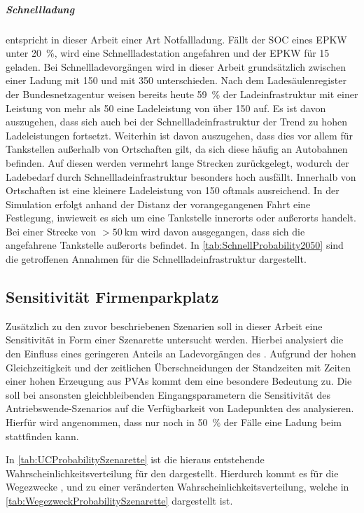 \subparagraph{Schnellladung} entspricht in dieser Arbeit einer Art Notfallladung.
Fällt der \gls{SOC} eines \gls{EPKW} unter \SI{20}{\percent}, wird eine Schnellladestation angefahren und der \gls{EPKW} für \SI{15}{\Minuten} geladen.
Bei Schnellladevorgängen wird in dieser Arbeit grundsätzlich zwischen einer Ladung mit \SI{150}{\kw} und mit \SI{350}{\kw} unterschieden.
Nach dem Ladesäulenregister der Bundesnetzagentur \cite[][Stand: ]{BundesnetzagenturElektrizitaet2020} weisen bereits heute \SI{59}{\percent} der Ladeinfrastruktur mit einer Leistung von mehr als \SI{50}{\kw} eine Ladeleistung von über \SI{150}{\kw} auf.
Es ist davon auszugehen, dass sich auch bei der Schnellladeinfrastruktur der Trend zu hohen Ladeleistungen fortsetzt.
Weiterhin ist davon auszugehen, dass dies vor allem für Tankstellen außerhalb von Ortschaften gilt, da sich diese häufig an Autobahnen befinden.
Auf diesen werden vermehrt lange Strecken zurückgelegt, wodurch der Ladebedarf durch Schnellladeinfrastruktur besonders hoch ausfällt.
Innerhalb von Ortschaften ist eine kleinere Ladeleistung von \SI{150}{\kw} oftmals ausreichend.
In der Simulation erfolgt anhand der Distanz der vorangegangenen Fahrt eine Festlegung, inwieweit es sich um eine Tankstelle innerorts oder außerorts handelt.
Bei einer Strecke von \(>\!\SI{50}{\km}\) wird davon ausgegangen, dass sich die angefahrene Tankstelle außerorts befindet.
In \autoref{tab:SchnellProbability2050} sind die getroffenen Annahmen für die Schnellladeinfrastruktur dargestellt.




\subsection{Sensitivität Firmenparkplatz}

Zusätzlich zu den zuvor beschriebenen Szenarien soll in dieser Arbeit eine Sensitivität in Form einer Szenarette untersucht werden.
Hierbei analysiert die \SzeFirmenparkplatz den Einfluss eines geringeren Anteils an Ladevorgängen des \UC \Firmeparkplatzdot.
Aufgrund der hohen Gleichzeitigkeit und der zeitlichen Überschneidungen der Standzeiten mit Zeiten einer hohen Erzeugung aus \glspl{PVA} kommt dem \UC \Firmeparkplatz eine besondere Bedeutung zu.
Die \SzeFirmenparkplatz soll bei ansonsten gleichbleibenden Eingangsparametern die Sensitivität des Antriebswende-Szenarios auf die Verfügbarkeit von Ladepunkten des \UC \Firmeparkplatz analysieren.
Hierfür wird angenommen, dass nur noch in \SI{50}{\percent} der Fälle eine Ladung beim \UC \Firmeparkplatz stattfinden kann.



In \autoref{tab:UCProbabilitySzenarette} ist die hieraus entstehende Wahrscheinlichkeitsverteilung für den \UC \Firmeparkplatz dargestellt.
Hierdurch kommt es für die Wegezwecke \Arbeitdot, \dienst und \Ausbildung zu einer veränderten Wahrscheinlichkeitsverteilung, welche in \autoref{tab:WegezweckProbabilitySzenarette} dargestellt ist.




\clearpage
